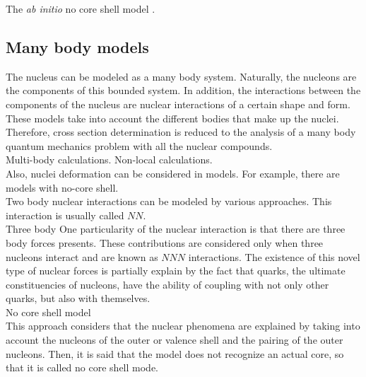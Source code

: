 \documentclass[openany]{book}
\begin{document}
The \textit{ab initio} no core shell model \cite{barrett_navratil_vary_2013}. \\


\subsection{Many body models}  \label{sub:microscopical_manybody}

The nucleus can be modeled as a many body system. Naturally, the nucleons are the components of this bounded system. In addition, the interactions between the components of the nucleus are nuclear interactions of a certain shape and form.  \\

These models take into account the different bodies that make up the nuclei. \\

Therefore,  cross section determination is reduced to the analysis of a many body quantum mechanics problem with all the nuclear compounds. \\

Multi-body calculations.  Non-local calculations. \\

Also, nuclei deformation can be considered in models. For example, there are models with no-core shell. \\

Two body nuclear interactions can be modeled by various approaches. This interaction is usually called $NN$. \\

Three body \cite{grigorenko_danilin_efros_shulgina_zhukov_1998}
One particularity of the nuclear interaction is that there are three body forces presents. These contributions are considered only when three nucleons interact and are known as $NNN$ interactions. The existence of this novel type of nuclear forces is partially explain by the fact that quarks, the ultimate constituencies of nucleons, have the ability of coupling with not only other quarks, but also with themselves. \\

No core shell model \cite{dohet-eraly_navratil_quaglioni_horiuchi_hupin_raimondi_2016} \\

This approach considers that the nuclear phenomena are explained by taking into account the nucleons of the outer or valence shell and the pairing of the outer nucleons. Then, it is said that the model does not recognize an actual core, so that it is called no core shell mode. \\
\end{document}
